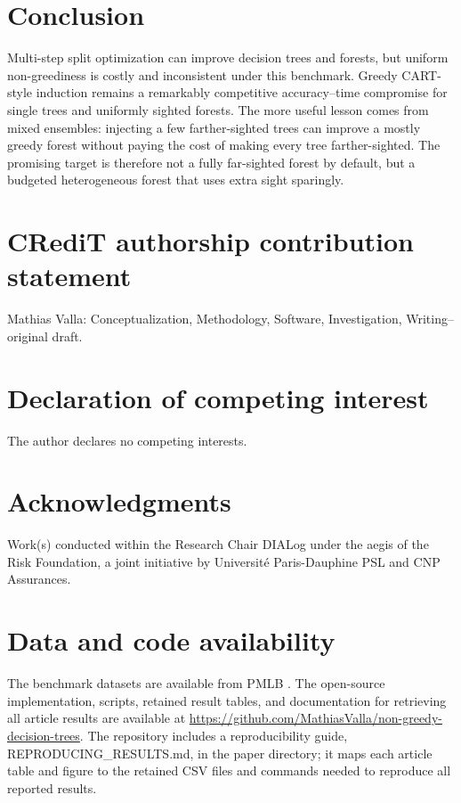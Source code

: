 \documentclass[final,5p,times]{elsarticle}
\begin{document}
\section{Conclusion}

Multi-step split optimization can improve decision trees and forests, but uniform non-greediness is costly and inconsistent under this benchmark. Greedy CART-style induction remains a remarkably competitive accuracy--time compromise for single trees and uniformly sighted forests. The more useful lesson comes from mixed ensembles: injecting a few farther-sighted trees can improve a mostly greedy forest without paying the cost of making every tree farther-sighted. The promising target is therefore not a fully far-sighted forest by default, but a budgeted heterogeneous forest that uses extra sight sparingly.

\section*{CRediT authorship contribution statement}
Mathias Valla: Conceptualization, Methodology, Software, Investigation, Writing--original draft.

\section*{Declaration of competing interest}
The author declares no competing interests.

\section*{Acknowledgments}
Work(s) conducted within the Research Chair DIALog under the aegis of the Risk Foundation, a joint initiative by Universit{\'e} Paris-Dauphine PSL and CNP Assurances.

\section*{Data and code availability}
The benchmark datasets are available from PMLB \cite{olson2017pmlb}. The open-source implementation, scripts, retained result tables, and documentation for retrieving all article results are available at \href{https://github.com/MathiasValla/non-greedy-decision-trees}{https://github.com/MathiasValla/non-greedy-decision-trees}. The repository includes a reproducibility guide, REPRODUCING\_\allowbreak RESULTS.md, in the paper directory; it maps each article table and figure to the retained CSV files and commands needed to reproduce all reported results.



\end{document}

